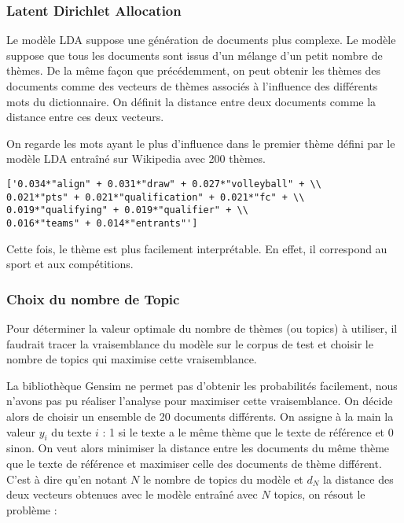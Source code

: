 \documentclass[12pt]{article}
\begin{document}
\subsubsection{Latent Dirichlet Allocation}
\noindent
Le modèle LDA suppose une génération de documents plus complexe. Le modèle suppose que tous les documents sont issus d'un mélange d'un petit nombre de thèmes. De la même façon que précédemment, on peut obtenir les thèmes des documents comme des vecteurs de thèmes associés à l'influence des différents mots du dictionnaire. On définit la distance entre deux documents comme la distance entre ces deux vecteurs.

\noindent
On regarde les mots ayant le plus d'influence dans le premier thème défini par le modèle LDA entraîné sur Wikipedia avec 200 thèmes.
\begin{verbatim}
['0.034*"align" + 0.031*"draw" + 0.027*"volleyball" + \\
0.021*"pts" + 0.021*"qualification" + 0.021*"fc" + \\
0.019*"qualifying" + 0.019*"qualifier" + \\
0.016*"teams" + 0.014*"entrants"']
\end{verbatim}
Cette fois, le thème est plus facilement interprétable. En effet, il correspond au sport et aux compétitions.

\subsubsection{Choix du nombre de Topic}
\noindent
Pour déterminer la valeur optimale du nombre de thèmes (ou topics) à utiliser, il faudrait tracer la vraisemblance du modèle sur le corpus de test et choisir le nombre de topics qui maximise cette vraisemblance.

\noindent
La bibliothèque Gensim ne permet pas d'obtenir les probabilités facilement, nous n'avons pas pu réaliser l'analyse pour maximiser cette vraisemblance. On décide alors de choisir un ensemble de 20 documents différents. On assigne à la main la valeur $y_i$ du texte $i$ : 1 si le texte a le même thème que le texte de référence et 0 sinon. On veut alors minimiser la distance entre les documents du même thème que le texte de référence et maximiser celle des documents de thème différent. C'est à dire qu'en notant $N$ le nombre de topics du modèle et $d_N$ la distance des deux vecteurs obtenues avec le modèle entraîné avec $N$ topics, on résout le problème :
\end{document}
